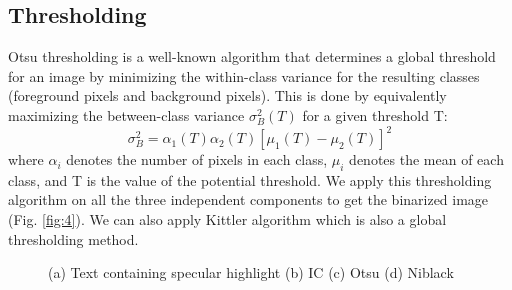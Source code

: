 \subsection{Thresholding}

Otsu thresholding \cite{A2} is a well-known algorithm that
determines a global threshold for an image by minimizing 
the within-class variance for the resulting classes (foreground pixels 
and background pixels). This is
done by equivalently maximizing the between-class variance
$\sigma _{B}^{2}(T)$ for a given threshold T:
\begin{equation}
\sigma_{B}^{2}=\alpha_1(T)\alpha_2(T)[\mu_1(T)-\mu_2(T)]^2 
\end{equation}
where $\alpha_i$ denotes the number of pixels in each class, $\mu_i$ denotes 
the mean of each class, and T is the value of the potential threshold. 
We apply this thresholding algorithm on all the three independent components to get the binarized image (Fig. \ref{fig:4}).
We can also apply Kittler \cite{A5} algorithm which is also a global thresholding method.
\begin{figure}[tp]
\centering
{}
\caption
{(a) Text containing specular highlight (b) IC (c) Otsu (d) Niblack}
\label{fig:5}
\end{figure}

